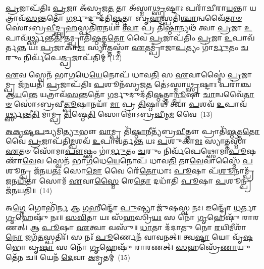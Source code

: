 {\anuvakamend[{𑌬𑌲᳴𑌮\-\ul{𑌸𑍍𑌯𑍇}\-𑌤𑌯𑌾᳴ \ul{𑌦𑍇}\-𑌵𑌾 𑌅𑌸𑍁᳴𑌰𑌾\-\ul{𑌣𑌾}\-𑌮𑍋\-\ul{𑌜𑍋} 𑌬𑌲᳴𑌮𑌿\-\ul{𑌨𑍍𑌦𑍍𑌰𑌿}\-𑌯𑌂 \ul{𑌵𑍀}\-𑌰𑍍𑌯𑌂᳴ 𑌪𑌞𑍍𑌚᳴𑌚𑌤𑍍𑌵𑌾𑌰𑌿𑍞𑌶𑌚𑍍𑌚}]}%

\-\ul{𑌪𑍍𑌰}\-𑌜𑌾𑌪᳴𑌤𑌿𑌃 \ul{𑌪𑍍𑌰}\-𑌜𑌾 𑌅᳴𑌸𑍃𑌜\-\ul{𑌤} 𑌤𑌾 𑌅᳴𑌸𑍍𑌮𑌾\-\ul{𑌥𑍍𑌸𑍃}\-𑌷𑍍𑌟𑌾𑌃 𑌪𑌰𑌾᳴𑌚𑍀𑌰𑌾\-\ul{𑌯}\-𑌨𑍍𑌤𑌾 𑌯𑌤𑍍𑌰𑌾𑌵᳴\-\ul{𑌸}\-𑌨𑍍𑌤𑌤𑍋᳴ \ul{𑌗}\-𑌰𑍍𑌮𑍁𑌦𑍁𑌦᳴𑌤𑌿\-\ul{𑌷𑍍𑌠}\-𑌤𑍍𑌤𑌾 𑌬𑍃\-\ul{𑌹}\-𑌸𑍍𑌪𑌤𑌿᳴\-\ul{𑌶𑍍𑌚𑌾}\-𑌨𑍍𑌵𑌵𑍈᳴\-\ul{𑌤𑌾}\-\-\ul{𑍞} 𑌸𑍋॑\-𑌽𑌬𑍍𑌰\-\ul{𑌵𑍀}\-𑌦𑍍𑌬𑍃\-\ul{𑌹}\-𑌸𑍍𑌪𑌤𑌿᳴\-\ul{𑌰}\-𑌨𑌯𑌾॑ \ul{𑌤𑍍𑌵𑌾} 𑌪𑍍𑌰 𑌤𑌿᳴\-\ul{𑌷𑍍𑌠𑌾}\-𑌨𑍍𑌯𑌥᳴ 𑌤𑍍𑌵𑌾 \ul{𑌪𑍍𑌰}\-𑌜𑌾 \ul{𑌉}\-𑌪𑌾𑌵᳴\-\ul{𑌰𑍍𑌥𑍍𑌸𑍍𑌯}\-𑌨𑍍𑌤𑍀\-\ul{𑌤𑌿} 𑌤𑌮𑍍𑌪𑍍𑌰𑌾𑌤𑌿᳴\-\ul{𑌷𑍍𑌠}\-𑌤𑍍𑌤\-\ul{𑌤𑍋} 𑌵𑍈 \ul{𑌪𑍍𑌰}\-𑌜𑌾𑌪᳴𑌤𑌿𑌂 \ul{𑌪𑍍𑌰}\-𑌜𑌾 \ul{𑌉}\-𑌪𑌾𑌵᳴𑌰𑍍𑌤\-\ul{𑌨𑍍𑌤} 𑌯𑌃 \ul{𑌪𑍍𑌰}\-𑌜𑌾𑌕𑌾᳴\-\ul{𑌮𑌃} 𑌸𑍍𑌯𑌾𑌤𑍍𑌤𑌸𑍍𑌮𑌾᳴ \ul{𑌏}\-𑌤𑌮𑍍𑌪𑍍𑌰𑌾᳴𑌜𑌾\-\ul{𑌪}\-𑌤𑍍𑌯𑌂 𑌗𑌾॑\-\ul{𑌰𑍍𑌮𑍁}\-𑌤𑌂 \ul{𑌚}\-𑌰𑍁𑌂 𑌨𑌿𑌰𑍍𑌵᳴𑌪𑍇\-\ul{𑌤𑍍𑌪𑍍𑌰}\-𑌜𑌾𑌪᳴𑌤𑌿𑌮𑍍~(12)

\-\ul{𑌏}\-𑌵 𑌸𑍍𑌵𑍇𑌨᳴ 𑌭𑌾\-\ul{𑌗}\-𑌧𑍇\-\ul{𑌯𑍇}\-𑌨𑍋𑌪᳴ 𑌧𑌾𑌵\-\ul{𑌤𑌿} 𑌸 \ul{𑌏}\-𑌵𑌾𑌸𑍍𑌮𑍈॑ \ul{𑌪𑍍𑌰}\-𑌜𑌾𑌮𑍍𑌪𑍍𑌰 𑌜᳴𑌨𑌯𑌤𑌿 \ul{𑌪𑍍𑌰}\-𑌜𑌾𑌪᳴𑌤𑌿𑌃 \ul{𑌪}\-𑌶𑍂𑌨᳴𑌸𑍃𑌜\-\ul{𑌤} 𑌤𑍇॑\-𑌽𑌸𑍍𑌮𑌾\-\ul{𑌥𑍍𑌸𑍃}\-𑌷𑍍𑌟𑌾𑌃 𑌪𑌰𑌾॑𑌞𑍍𑌚 𑌆\-\ul{𑌯}\-𑌨𑍍𑌤𑍇 𑌯𑌤𑍍𑌰𑌾𑌵᳴\-\ul{𑌸}\-𑌨𑍍𑌤𑌤𑍋᳴ \ul{𑌗}\-𑌰𑍍𑌮𑍁𑌦𑍁𑌦᳴𑌤𑌿\-\ul{𑌷𑍍𑌠}\-𑌤𑍍𑌤𑌾\-\ul{𑌨𑍍𑌪𑍂}\-𑌷𑌾 \ul{𑌚𑌾}\-𑌨𑍍𑌵𑌵𑍈᳴\-\ul{𑌤𑌾}\-\-\ul{𑍞} 𑌸𑍋॑\-𑌽𑌬𑍍𑌰𑌵𑍀\-\ul{𑌤𑍍𑌪𑍂}\-𑌷𑌾𑌨𑌯𑌾᳴ \ul{𑌮𑌾} 𑌪𑍍𑌰 \ul{𑌤𑌿}\-𑌷𑍍𑌠𑌾𑌥᳴ 𑌤𑍍𑌵𑌾 \ul{𑌪}\-𑌶𑌵᳴ \ul{𑌉}\-𑌪𑌾𑌵᳴\-\ul{𑌰𑍍𑌥𑍍𑌸𑍍𑌯}\-𑌨𑍍𑌤𑍀\-\ul{𑌤𑌿} 𑌮𑌾𑌮𑍍𑌪𑍍𑌰 \ul{𑌤𑌿}\-𑌷𑍍𑌠𑍇\-\ul{𑌤𑌿} 𑌸𑍋𑌮𑍋॑\-𑌽𑌬𑍍𑌰\-\ul{𑌵𑍀}\-𑌨𑍍𑌮\-\ul{𑌮} 𑌵𑍈~(13)

\-\ul{𑌅}\-\-\ul{𑌕𑍃}\-\-\ul{𑌷𑍍𑌟}\-\-\ul{𑌪}\-𑌚𑍍𑌯𑌮𑌿\-\ul{𑌤𑍍𑌯𑍁}\-𑌭𑍗 \ul{𑌵𑌾}\-𑌮𑍍𑌪𑍍𑌰 𑌤𑌿᳴\-\ul{𑌷𑍍𑌠𑌾}\-𑌨𑍀𑌤𑍍𑌯᳴𑌬𑍍𑌰\-\ul{𑌵𑍀}\-𑌤𑍍𑌤𑍗 𑌪𑍍𑌰𑌾𑌤𑌿᳴\-\ul{𑌷𑍍𑌠}\-𑌤𑍍𑌤\-\ul{𑌤𑍋} 𑌵𑍈 \ul{𑌪𑍍𑌰}\-𑌜𑌾𑌪᳴𑌤𑌿\-\ul{𑌮𑍍𑌪}\-𑌶𑌵᳴ \ul{𑌉}\-𑌪𑌾𑌵᳴𑌰𑍍𑌤\-\ul{𑌨𑍍𑌤} 𑌯𑌃 \ul{𑌪}\-𑌶𑍁𑌕𑌾᳴\-\ul{𑌮𑌃} 𑌸𑍍𑌯𑌾𑌤𑍍𑌤𑌸𑍍𑌮𑌾᳴ \ul{𑌏}\-𑌤𑍞 𑌸𑍋᳴𑌮𑌾\-\ul{𑌪𑍗}\-𑌷𑍍𑌣𑌂 𑌗𑌾॑\-\ul{𑌰𑍍𑌮𑍁}\-𑌤𑌂 \ul{𑌚}\-𑌰𑍁𑌂 𑌨𑌿𑌰𑍍𑌵᳴𑌪𑍇𑌥𑍍𑌸𑍋𑌮𑌾\-\ul{𑌪𑍂}\-𑌷𑌣𑌾᳴\-\ul{𑌵𑍇}\-𑌵 𑌸𑍍𑌵𑍇𑌨᳴ 𑌭𑌾\-\ul{𑌗}\-𑌧𑍇\-\ul{𑌯𑍇}\-𑌨𑍋𑌪᳴ 𑌧𑌾𑌵\-\ul{𑌤𑌿} 𑌤𑌾\-\ul{𑌵𑍇}\-𑌵𑌾𑌸𑍍𑌮𑍈᳴ \ul{𑌪}\-𑌶𑍂𑌨𑍍𑌪𑍍𑌰 𑌜᳴𑌨𑌯\-\ul{𑌤𑌃} 𑌸𑍋\-\ul{𑌮𑍋} 𑌵𑍈 𑌰𑍇᳴\-\ul{𑌤𑍋}\-𑌧𑌾𑌃 \ul{𑌪𑍂}\-𑌷𑌾 𑌪᳴\-\ul{𑌶𑍂}\-𑌨𑌾𑌮𑍍𑌪𑍍𑌰᳴𑌜𑌨\-\ul{𑌯𑌿}\-𑌤𑌾 𑌸𑍋𑌮᳴ \ul{𑌏}\-𑌵𑌾\-\ul{𑌸𑍍𑌮𑍈} 𑌰𑍇\-\ul{𑌤𑍋} 𑌦𑌧𑌾᳴𑌤𑌿 \ul{𑌪𑍂}\-𑌷𑌾 \ul{𑌪}\-𑌶𑍂𑌨𑍍𑌪𑍍𑌰 𑌜᳴𑌨𑌯𑌤𑌿॥~(14)

{\anuvakamend[{\-\ul{𑌵}\-\-\ul{𑌪𑍇}\-\-\ul{𑌤𑍍𑌪𑍍𑌰}\-𑌜𑌾𑌪᳴\-\ul{𑌤𑌿𑌂} 𑌵𑍈 𑌦𑌧𑌾᳴𑌤𑌿 \ul{𑌪𑍂}\-𑌷𑌾 𑌤𑍍𑌰𑍀𑌣𑌿᳴ 𑌚}]}%

𑌅\-\ul{𑌗𑍍𑌨𑍇} 𑌗𑍋𑌭𑌿᳴\-\ul{𑌰𑍍𑌨} 𑌆 \ul{𑌗}\-𑌹𑍀𑌨𑍍𑌦𑍋᳴ \ul{𑌪𑍁}\-𑌷𑍍𑌟𑍍𑌯𑌾 𑌜𑍁᳴𑌷𑌸𑍍𑌵 𑌨𑌃। 𑌇𑌨𑍍𑌦𑍍𑌰𑍋᳴ \ul{𑌧}\-𑌰𑍍𑌤𑌾 \ul{𑌗𑍃}\-𑌹𑍇𑌷𑍁᳴ 𑌨𑌃॥ \ul{𑌸}\-\-\ul{𑌵𑌿}\-𑌤𑌾 𑌯𑌃 𑌸᳴\-\ul{𑌹}\-𑌸𑍍𑌰𑌿\-\ul{𑌯𑌃} 𑌸 𑌨𑍋᳴ \ul{𑌗𑍃}\-𑌹𑍇𑌷𑍁᳴ 𑌰𑌾𑌰𑌣𑌤𑍍। 𑌆 \ul{𑌪𑍂}\-𑌷𑌾 \ul{𑌏}\-𑌤𑍍𑌵𑌾 𑌵𑌸𑍁᳴॥ \ul{𑌧𑌾}\-𑌤𑌾 𑌦᳴𑌦𑌾𑌤𑍁 𑌨𑍋 \ul{𑌰}\-𑌯𑌿𑌮𑍀𑌶𑌾᳴\-\ul{𑌨𑍋} 𑌜𑌗᳴\-\ul{𑌤}\-𑌸𑍍𑌪𑌤𑌿𑌃᳴। 𑌸 𑌨𑌃᳴ \ul{𑌪𑍂}\-𑌰𑍍𑌣𑍇𑌨᳴ 𑌵𑌾𑌵𑌨𑌤𑍍॥ 𑌤𑍍𑌵\-\ul{𑌷𑍍𑌟𑌾} 𑌯𑍋 𑌵𑍃᳴\-\ul{𑌷}\-𑌭𑍋 𑌵𑍃\-\ul{𑌷𑌾} 𑌸 𑌨𑍋᳴ \ul{𑌗𑍃}\-𑌹𑍇𑌷𑍁᳴ 𑌰𑌾𑌰𑌣𑌤𑍍। \ul{𑌸}\-𑌹𑌸𑍍𑌰𑍇᳴\-\ul{𑌣𑌾}\-𑌯𑍁𑌤𑍇᳴𑌨 𑌚॥ 𑌯𑍇𑌨᳴ \ul{𑌦𑍇}\-𑌵𑌾 \ul{𑌅}\-𑌮𑍃𑌤𑌮𑍍॑~(15)


